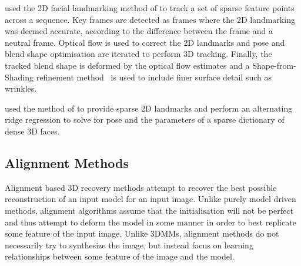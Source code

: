 \citet{Garrido:2013dia} used the 2D facial landmarking method of
\citet{saragih2011deformable} to track a set of sparse feature points across
a sequence. Key frames are detected as frames where the 2D landmarking was
deemed accurate, according to the difference between the frame and a neutral
frame. Optical flow is used to correct the 2D landmarks and pose and blend shape
optimisation are iterated to perform 3D tracking. Finally, the tracked
blend shape is deformed by the optical flow estimates and a Shape-from-Shading
refinement method~\cite{valgaerts2012lightweight} is used to include finer
surface detail such as wrinkles.

\citet{ferrari2015dictionary} used the method of
\citet{xiong2013supervised} to provide sparse 2D landmarks and perform
an alternating ridge regression to solve for pose and the parameters of a sparse
dictionary of dense 3D faces.
\subsection{Alignment Methods}\label{subsec:bg_model_based_alignment}
Alignment based 3D recovery methods attempt to recover the best possible
reconstruction of an input model for an input image. Unlike purely model
driven methods, alignment algorithms assume that the initialisation will not be
perfect and thus attempt to deform the model in some manner in order to best
replicate some feature of the input image. Unlike 3DMMs, alignment methods
do not necessarily try to synthesize the image, but instead focus on learning
relationships between some feature of the image and the model.

